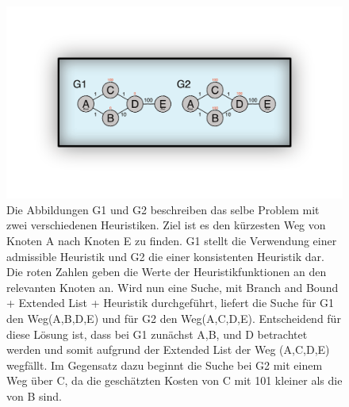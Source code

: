 \begin{figure}[h!]
	\centering
	\includegraphics[scale=0.5]{chapters/informed_search/BeispielHeuristik.png}
	\caption{Die Abbildungen G1 und G2 beschreiben das selbe Problem mit zwei verschiedenen Heuristiken. Ziel ist es den k\"urzesten Weg von Knoten A nach Knoten E zu finden. G1 stellt die Verwendung einer admissible Heuristik und G2 die einer konsistenten Heuristik dar. Die roten Zahlen geben die Werte der Heuristikfunktionen an den relevanten Knoten an. Wird nun eine Suche, mit Branch and Bound + Extended List + Heuristik durchgef\"uhrt, liefert die Suche f\"ur G1 den Weg(A,B,D,E) und f\"ur G2 den Weg(A,C,D,E). Entscheidend f\"ur diese L\"osung ist, dass bei G1 zun\"achst A,B, und D betrachtet werden und somit aufgrund der Extended List der Weg (A,C,D,E) wegf\"allt. Im Gegensatz dazu beginnt die Suche bei G2 mit einem Weg \"uber C, da die gesch\"atzten Kosten von C mit 101 kleiner als die von B sind.}
\end{figure}

